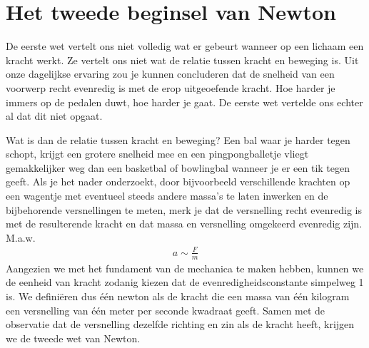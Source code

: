 \documentclass{ximera}
\begin{document}
	\author{Bart Lambregs}
    \xmsource


	\section{Het tweede beginsel van Newton}

	De eerste wet vertelt ons niet volledig wat er gebeurt wanneer op een lichaam een kracht werkt. Ze vertelt ons niet wat de relatie tussen kracht en beweging is. Uit onze dagelijkse ervaring zou je kunnen concluderen dat de snelheid van een voorwerp recht evenredig is met de erop uitgeoefende kracht. Hoe harder je immers op de pedalen duwt, hoe harder je gaat. De eerste wet vertelde ons echter al dat dit niet opgaat. 
	
	Wat is dan de relatie tussen kracht en beweging? Een bal waar je harder tegen schopt, krijgt een grotere snelheid mee en een pingpongballetje vliegt gemakkelijker weg dan een basketbal of bowlingbal wanneer je er een tik tegen geeft. Als je het nader onderzoekt, door bijvoorbeeld verschillende krachten op een wagentje met eventueel steeds andere massa's te laten inwerken en de bijbehorende versnellingen te meten, merk je dat de versnelling recht evenredig is met de resulterende kracht en dat massa en versnelling omgekeerd evenredig zijn. M.a.w.
	\begin{eqnarray*}
	a\sim\frac{F}{m}
	\end{eqnarray*}
	Aangezien we met het fundament van de mechanica te maken hebben, kunnen we de eenheid van kracht zodanig kiezen dat de evenredigheidsconstante simpelweg 1 is. We defini\"eren dus \'e\'en newton als de kracht die een massa van \'e\'en kilogram een versnelling van \'e\'en meter per seconde kwadraat geeft. Samen met de observatie dat de versnelling dezelfde richting en zin als de kracht heeft, krijgen we de tweede wet van Newton.
	
\end{document}
